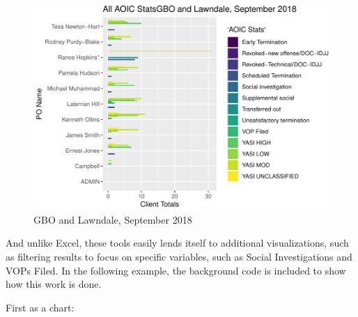 \documentclass[12pt,]{article}
\newenvironment{Shaded}{\begin{snugshade}}{\end{snugshade}}
\newcommand{\DataTypeTok}[1]{\textcolor[rgb]{0.13,0.29,0.53}{#1}}
\newcommand{\DecValTok}[1]{\textcolor[rgb]{0.00,0.00,0.81}{#1}}
\newcommand{\KeywordTok}[1]{\textcolor[rgb]{0.13,0.29,0.53}{\textbf{#1}}}
\newcommand{\NormalTok}[1]{#1}
\newcommand{\OperatorTok}[1]{\textcolor[rgb]{0.81,0.36,0.00}{\textbf{#1}}}
\newcommand{\OtherTok}[1]{\textcolor[rgb]{0.56,0.35,0.01}{#1}}
\newcommand{\StringTok}[1]{\textcolor[rgb]{0.31,0.60,0.02}{#1}}
\begin{document}
\begin{figure}[h]
\includegraphics[width=0.9\linewidth,height=0.9\textheight,]{reporting_updates_files/figure-latex/initial_graphs-1} \caption{GBO and Lawndale, September 2018}\label{fig:initial_graphs}
\end{figure}

\newpage

And unlike Excel, these tools easily lends itself to additional
visualizations, such as filtering results to focus on specific
variables, such as Social Investigations and VOPs Filed. In the
following example, the background code is included to show how this work
is done.

First as a chart:

\begin{Shaded}
\end{Shaded}
\end{document}
